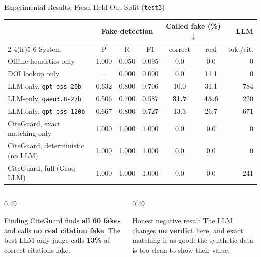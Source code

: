 \documentclass[aspectratio=169,10pt]{beamer}
\newcommand{\hl}[1]{\textcolor{accentblue}{\textbf{#1}}}
\newcommand{\bad}[1]{\textcolor{badred}{\textbf{#1}}}
\newcommand{\na}{\textcolor{gray}{--}}
\begin{document}
\begin{frame}{Experimental Results: Fresh Held-Out Split (\texttt{test3})}
  \centering
  \scriptsize
  \renewcommand{\arraystretch}{1.15}
  \begin{tabular}{l ccc cc r}
    \toprule
    & \multicolumn{3}{c}{Fake detection} & \multicolumn{2}{c}{Called fake (\%) $\downarrow$} & LLM \\
    \cmidrule(lr){2-4}\cmidrule(lr){5-6}
    System & P & R & F1 & correct & real & tok./cit. \\
    \midrule
    Offline heuristics only & 1.000 & 0.050 & 0.095 & 0.0 & 0.0 & 0 \\
    DOI lookup only \cite{hallmark} & \na & 0.000 & 0.000 & 0.0 & 11.1 & 0 \\
    \midrule
    LLM-only, \texttt{gpt-oss-20b} & 0.632 & 0.800 & 0.706 & 10.0 & 31.1 & 784 \\
    LLM-only, \texttt{qwen3.8-27b} & 0.506 & 0.700 & 0.587 & \bad{31.7} & \bad{45.6} & 220 \\
    LLM-only, \texttt{gpt-oss-120b} & 0.667 & 0.800 & 0.727 & 13.3 & 26.7 & 671 \\
    \midrule
    \rowcolor{goodgreen}
    CiteGuard, exact matching only & 1.000 & 1.000 & 1.000 & 0.0 & 0.0 & 0 \\
    \rowcolor{goodgreen}
    CiteGuard, deterministic (no LLM) & 1.000 & 1.000 & 1.000 & 0.0 & 0.0 & 0 \\
    \rowcolor{goodgreen}
    CiteGuard, full (Groq LLM) & 1.000 & 1.000 & 1.000 & 0.0 & 0.0 & 241 \\
    \bottomrule
  \end{tabular}
  \vspace{4pt}

  \begin{columns}[T]
    \begin{column}{0.49\textwidth}
      \begin{block}{Finding}
        \scriptsize CiteGuard finds \hl{all 60 fakes} and calls \hl{no real citation fake}. The best
        LLM-only judge calls \bad{13\%} of correct citations fake.
      \end{block}
    \end{column}
    \begin{column}{0.49\textwidth}
      \begin{alertblock}{Honest negative result}
        \scriptsize The LLM changes \hl{no verdict} here, and exact matching is as good: the synthetic
        data is too clean to show their value.
      \end{alertblock}
    \end{column}
  \end{columns}
\end{frame}
\end{document}
